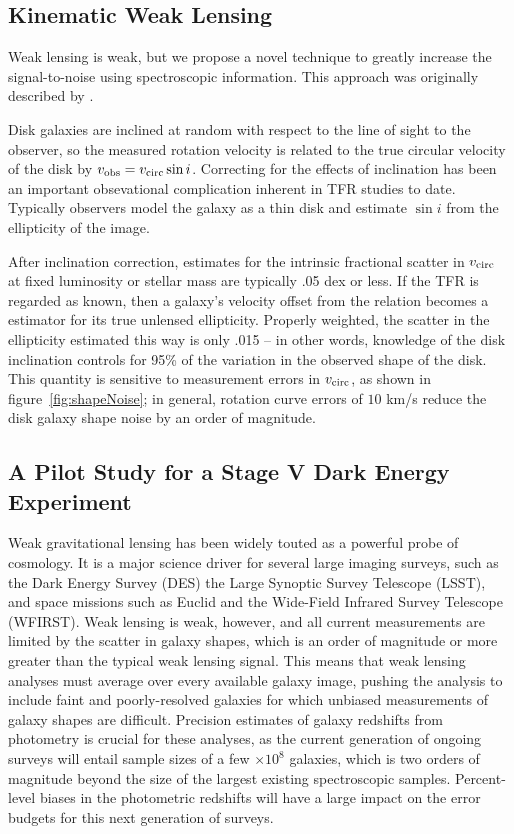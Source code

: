\documentclass[11pt,preprint]{aastex}
\begin{document}
\subsection{Kinematic Weak Lensing}

Weak lensing is weak, but we propose a novel technique to greatly increase the signal-to-noise using spectroscopic information. This approach was originally described by \citet{Blain2002, Morales2006}.

Disk galaxies are inclined at random with respect to the line of sight to the observer, so the measured rotation velocity is related to the true circular velocity of the disk by $v_{\rm obs} = v_{\rm circ} \sin i$. Correcting for the effects of inclination has been an important obsevational complication inherent in TFR studies to date. Typically observers model the galaxy as a thin disk and estimate $\sin i$ from the ellipticity of the image.

After inclination correction, estimates for the intrinsic fractional scatter in $v_{\rm circ}$ at fixed luminosity or stellar mass are typically .05 dex or less. If the TFR is regarded as known, then a galaxy's velocity offset from the relation becomes a estimator for its true unlensed ellipticity. Properly weighted, the scatter in the ellipticity estimated this way is only .015 -- in other words, knowledge of the disk inclination controls for 95\% of the variation in the observed shape of the disk. This quantity is sensitive to measurement errors in $v_{\rm circ}$, as shown in figure~\ref{fig:shapeNoise}; in general, rotation curve errors of $10 $ km/s reduce the disk galaxy shape noise by an order of magnitude.

\subsection{A Pilot Study for a Stage V Dark Energy Experiment}

Weak gravitational lensing has been widely touted as a powerful probe of cosmology. It is a major science driver for several large imaging surveys, such as the Dark Energy Survey (DES) the Large Synoptic Survey Telescope (LSST), and space missions such as Euclid and the Wide-Field Infrared Survey Telescope (WFIRST). Weak lensing is weak, however, and all current measurements are limited by the scatter in galaxy shapes, which is an order of magnitude or more greater than the typical weak lensing signal. This means that weak lensing analyses must average over every available galaxy image, pushing the analysis to include faint and poorly-resolved galaxies for which unbiased measurements of galaxy shapes are difficult. Precision estimates of galaxy redshifts from photometry is crucial for these analyses, as the current generation of ongoing surveys will entail sample sizes of a few $\times10^8$ galaxies, which is two orders of magnitude beyond the size of the largest existing spectroscopic samples. Percent-level biases in the photometric redshifts will have a large impact on the error budgets for this next generation of surveys.
\end{document}
